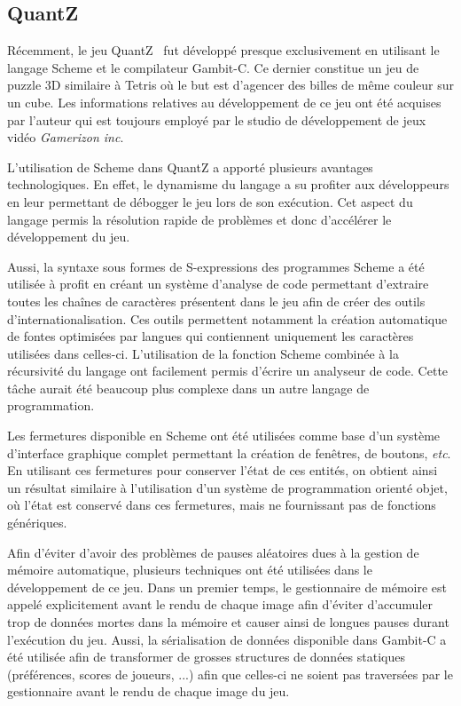 \documentclass[12pt,twoside,letterpaper,francais]{book}
\newcommand{\scheme}[1]{\selectlanguage{english}{\tt #1}\selectlanguage{french}}
\begin{document}
\FloatBarrier
\subsection{QuantZ}
Récemment, le jeu QuantZ~\cite{Quantz} fut développé presque
exclusivement en utilisant le langage Scheme et le compilateur
Gambit-C. Ce dernier constitue un jeu de puzzle 3D similaire à Tetris
où le but est d'agencer des billes de même couleur sur un cube. Les
informations relatives au dévelop\-pement de ce jeu ont été acquises par
l'auteur qui est toujours employé par le studio de dévelop\-pement de
jeux vidéo \textit{Gamerizon inc}.

L'utilisation de Scheme dans QuantZ a apporté plusieurs avantages
technologiques. En effet, le dynamisme du langage a su profiter aux
développeurs en leur permettant de débogger le jeu lors de son
exécution. Cet aspect du langage permis la résolution rapide de
problèmes et donc d'accélérer le dévelop\-pement du jeu.

Aussi, la syntaxe sous formes de S-expressions des programmes
Scheme a été utilisée à profit en créant un système d'analyse de
code permettant d'extraire toutes les chaînes de caractères présentent
dans le jeu afin de créer des outils d'internationalisation. Ces
outils permettent notamment la création automatique de fontes
optimisées par langues qui contiennent uniquement les caractères
utilisées dans celles-ci. L'utilisation de la fonction Scheme
\scheme{read} combinée à la récursivité du langage ont facilement
permis d'écrire un analyseur de code. Cette tâche aurait été beaucoup
plus complexe dans un autre langage de programmation.

Les fermetures disponible en Scheme ont été utilisées comme base d'un
système d'interface graphique complet permettant la création de
fenêtres, de boutons, \textit{etc}. En utilisant ces fermetures pour
conserver l'état de ces entités, on obtient ainsi un résultat
similaire à l'utilisation d'un système de programmation orienté objet,
où l'état est conservé dans ces fermetures, mais ne fournissant pas de
fonctions génériques.

Afin d'éviter d'avoir des problèmes de pauses aléatoires dues à la
gestion de mémoire automatique, plusieurs techniques ont été utilisées
dans le dévelop\-pement de ce jeu. Dans un premier temps, le
gestionnaire de mémoire est appelé explicitement avant le rendu de
chaque image afin d'éviter d'accumuler trop de données mortes dans la
mémoire et causer ainsi de longues pauses durant l'exécution du
jeu. Aussi, la sérialisation de données disponible dans Gambit-C a été
utilisée afin de transformer de grosses structures de données
statiques (préférences, scores de joueurs, ...) afin que celles-ci ne
soient pas traversées par le gestionnaire avant le rendu de chaque
image du jeu.
\end{document}
